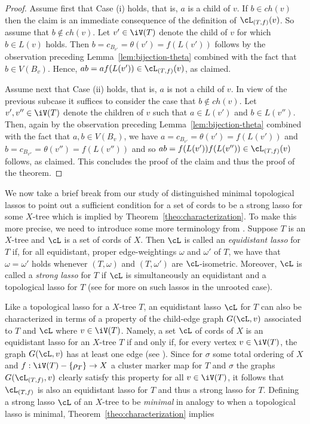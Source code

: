 \begin{proof}
Assume first that Case (i) holds, that is, $a$ is a child of $v$.  If $b\in
ch(v)$ then the claim is an immediate consequence of the definition of
$\cL_{(T,f)}(v)$. So assume that $b\not\in ch(v)$. Let $v'\in \iV(T)$ denote
the child of $v$ for which $b\in L(v)$ holds. Then
$b=c_{B_{v'}}=\theta(v')=f(L(v'))$ follows by the observation preceding
Lemma~\ref{lem:bijection-theta} combined with the fact that $b\in
V(B_v)$. Hence, $ab=af(L(v'))\in \cL_{(T,f)}(v)$, as claimed.

Assume next that Case (ii) holds, that is, $a$ is not a child of $v$.  In view
of the previous subcase it suffices to consider the case that $b\not\in
ch(v)$. Let $v',v''\in \iV(T)$ denote the children of $v$ such that $a\in
L(v')$ and $b\in L(v'')$.  Then, again by the observation preceding
Lemma~\ref{lem:bijection-theta} combined with the fact that $a,b\in V(B_v)$,
we have $a=c_{B_{v'}}=\theta(v')=f(L(v'))$ and
$b=c_{B_{v''}}=\theta(v'')=f(L(v''))$ and so $ab=f(L(v'))f(L(v''))\in
\cL_{(T,f)}(v)$ follows, as claimed.  This concludes the proof of the claim
and thus the proof of the theorem.
\end{proof}

We now take a brief break from our study of distinguished minimal topological
lassos to point out a sufficient condition for a set of cords to be a strong
lasso for some $X$-tree which is implied by
Theorem~\ref{theo:characterization}. To make this more precise, we need to
introduce some more terminology from \cite{HP13}. Suppose $T$ is an $X$-tree
and $\cL$ is a set of cords of $X$.  Then $\cL$ is called an {\em equidistant
  lasso} for $T$ if, for all equidistant, proper edge-weightings $\omega$ and
$\omega'$ of $T$, we have that $\omega=\omega'$ holds whenever $(T,\omega)$
and $(T,\omega')$ are $\cL$-isometric. Moreover, $\cL$ is called a {\em strong
  lasso} for $T$ if $\cL$ is simultaneously an equidistant and a topological
lasso for $T$ (see \cite{DHS11} for more on such lassos in the unrooted case).

Like a topological lasso for a $X$-tree $T$, an equidistant lasso $\cL$ for
$T$ can also be characterized in terms of a property of the child-edge graph
$G(\cL,v)$ associated to $T$ and $\cL$ where $v\in \iV(T)$. Namely, a set
$\cL$ of cords of $X$ is an equidistant lasso for an $X$-tree $T$ if and only
if, for every vertex $v\in \iV(T)$, the graph $G(\cL,v)$ has at least one edge
(see \cite[Theorem 6.1]{HP13}).  Since for $\sigma$ some total ordering of $X$
and $f:\iV(T)-\{\rho_T\}\to X$ a cluster marker map for $T$ and $\sigma$ the
graphs $G(\cL_{(T,f)},v)$ clearly satisfy this property for all $v\in \iV(T)$,
it follows that $\cL_{(T,f)}$ is also an equidistant lasso for $T$ and thus a
strong lasso for $T$. Defining a strong lasso $\cL$ of an $X$-tree to be {\em
  minimal} in analogy to when a topological lasso is minimal,
Theorem~\ref{theo:characterization} implies



